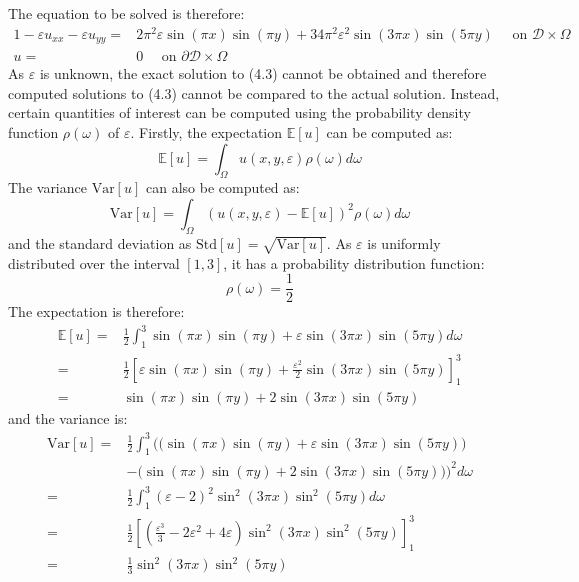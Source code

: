 \documentclass[11pt]{article}
\numberwithin{equation}{section}
\begin{document}
The equation to be solved is therefore:
\begin{alignat}{1}
- \varepsilon u_{xx} - \varepsilon u_{yy} = {} & 2\pi^2 \varepsilon \sin(\pi x) \sin(\pi y)+ 34 \pi^2 \varepsilon^2 \sin(3 \pi x) \sin(5 \pi y) \quad \text{ on } \mathcal{D} \times \Omega \nonumber \\
u = {} & 0 \quad \text{ on } \partial \mathcal{D} \times \Omega
\end{alignat}
As $\varepsilon$ is unknown, the exact solution to (4.3) cannot be obtained and therefore computed solutions to (4.3) cannot be compared to the actual solution. Instead, certain quantities of interest can be computed using the probability density function $\rho(\omega)$ of $\varepsilon$. Firstly, the expectation $\mathbb{E}[u]$ can be computed as:
\begin{equation}
\mathbb{E}[u] = \int_{\Omega} u(x,y,\varepsilon) \rho(\omega) d \omega
\end{equation}
The variance $\text{Var}[u]$ can also be computed as:
\begin{equation}
\text{Var}[u] = \int_{\Omega} \left(u(x,y,\varepsilon) - \mathbb{E}[u] \right)^2 \rho(\omega) d \omega
\end{equation}
and the standard deviation as $\text{Std}[u] = \sqrt{\text{Var}[u]}$. As $\varepsilon$ is uniformly distributed over the interval $[1,3]$, it has a probability distribution function:
\begin{equation}
\rho(\omega) = \frac{1}{2}
\end{equation}
The expectation is therefore:
\begin{equation}
\begin{split}
\mathbb{E}[u] = & \frac{1}{2} \int_{1}^3 \sin(\pi x)\sin(\pi y) + \varepsilon \sin(3 \pi x) \sin(5 \pi y) d \omega \\
= & \frac{1}{2} \left[\varepsilon \sin(\pi x) \sin(\pi y) + \frac{\varepsilon^2}{2} \sin(3 \pi x) \sin(5 \pi y)\right]_{1}^{3} \\
= & \sin(\pi x) \sin(\pi y) + 2 \sin(3\pi x)\sin(5\pi y)
\end{split}
\end{equation}
and the variance is:
\begin{equation}
\begin{split}
\text{Var}[u] = & \frac{1}{2} \int_{1}^3 \Big( \big( \sin(\pi x) \sin(\pi y) + \varepsilon \sin(3 \pi x) \sin(5 \pi y) \big) \\
& - \big(\sin(\pi x) \sin(\pi y) + 2\sin(3\pi x)\sin(5\pi y) \big) \Big)^2 d \omega \\
= & \frac{1}{2} \int_{1}^3 (\varepsilon-2)^2 \sin^2 (3 \pi x) \sin^2 (5 \pi y) d \omega \\
= & \frac{1}{2} \left[ \left( \frac{\varepsilon^3}{3}-2\varepsilon^2 + 4\varepsilon \right) \sin^2 (3 \pi x) \sin^2 (5 \pi y) \right]_{1}^3 \\
= & \frac{1}{3} \sin^2 (3 \pi x) \sin^2 (5 \pi y)
\end{split}
\end{equation}
\end{document}
